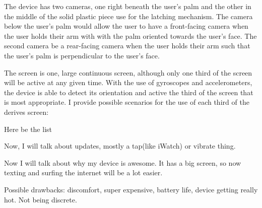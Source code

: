 \documentclass[11pt]{article}
\newcommand{\myreferences}{references}
\begin{document}
The device has two cameras, one right beneath the user's palm and the other in the middle of the solid plastic piece use for the latching mechanism. The camera below the user's palm would allow the user to have a front-facing camera when the user holds their arm with with the palm oriented towards the user's face. The second camera be a rear-facing camera when the user holds their arm such that the user's palm is perpendicular to the user's face. 

The screen is one, large continuous screen, although only one third of the screen will be active at any given time. With the use of gyroscopes and accelerometers, the device is able to detect its orientation and active the third of the screen that is most appropriate. I provide possible scenarios for the use of each third of the derives screen:

Here be the list

Now, I will talk about updates, mostly a tap(like iWatch) or vibrate thing. 

Now I will talk about why my device is awesome. It has a big screen, so now texting and surfing the internet will be a lot easier.

Possible drawbacks: discomfort, super expensive, battery life, device getting really hot. Not being discrete. 
 


\end{document}
